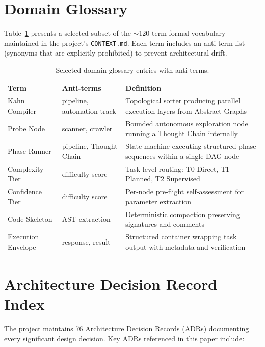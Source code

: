 \documentclass{article}
\begin{document}
\section{Domain Glossary}
\label{app:glossary}

Table~\ref{tab:glossary} presents a selected subset of the $\sim$120-term formal vocabulary maintained in the project's \texttt{CONTEXT.md}.
Each term includes an anti-term list (synonyms that are explicitly prohibited) to prevent architectural drift.

\begin{table}[h]
\centering
\small
\begin{tabular}{@{}llp{5.5cm}@{}}
\toprule
\textbf{Term} & \textbf{Anti-terms} & \textbf{Definition} \\
\midrule
Kahn Compiler & pipeline, automation track & Topological sorter producing parallel execution layers from Abstract Graphs \\
Probe Node & scanner, crawler & Bounded autonomous exploration node running a Thought Chain internally \\
Phase Runner & pipeline, Thought Chain & State machine executing structured phase sequences within a single DAG node \\
Complexity Tier & difficulty score & Task-level routing: T0 Direct, T1 Planned, T2 Supervised \\
Confidence Tier & difficulty score & Per-node pre-flight self-assessment for parameter extraction \\
Code Skeleton & AST extraction & Deterministic compaction preserving signatures and comments \\
Execution Envelope & response, result & Structured container wrapping task output with metadata and verification \\
\bottomrule
\end{tabular}
\caption{Selected domain glossary entries with anti-terms.}
\label{tab:glossary}
\end{table}

\section{Architecture Decision Record Index}
\label{app:adr_index}

The project maintains 76 Architecture Decision Records (ADRs) documenting every significant design decision.
Key ADRs referenced in this paper include:
\end{document}
